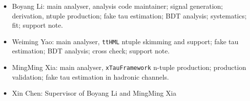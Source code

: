 \documentclass[UKenglish,texlive=2020]{\ATLASLATEXPATH atlasdoc}
\begin{document}
\begin{itemize}
\item Boyang Li: main analyser, analysis code maintainer; signal generation; derivation, ntuple production; fake tau estimation; BDT analysis; systematics; fit; support note.
\item Weiming Yao: main analyser, \texttt{ttHML} ntuple skimming and support; fake tau estimation; BDT analysis; cross check; support note.
\item MingMing Xia: main analyser, \texttt{xTauFramework} n-tuple production; production validation; fake tau estimation in hadronic channels.
\item Xin Chen: Supervisor of Boyang Li and MingMing Xia
\end{itemize}
\end{document}
